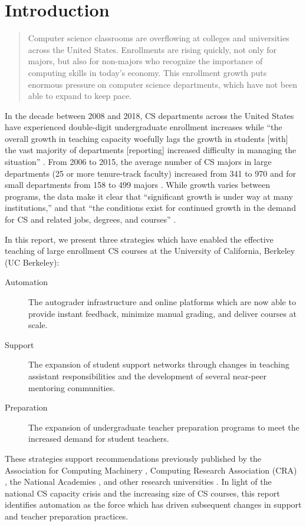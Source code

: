 \chapter{Introduction}
\label{chapter:introduction}

\begin{quote}
    Computer science classrooms are overflowing at colleges and universities across the United States. Enrollments are rising quickly, not only for majors, but also for non-majors who recognize the importance of computing skills in today's economy. This enrollment growth puts enormous pressure on computer science departments, which have not been able to expand to keep pace. \cite{Roberts:2018}
\end{quote}
In the decade between 2008 and 2018, CS departments across the United States have experienced double-digit undergraduate enrollment increases while ``the overall growth in teaching capacity woefully lags the growth in students [with] the vast majority of departments [reporting] increased difficulty in managing the situation'' \cite{TaulbeeSurvey2018}. From 2006 to 2015, the average number of CS majors in large departments (25 or more tenure-track faculty) increased from 341 to 970 and for small departments from 158 to 499 majors \cite{GenerationCS}. While growth varies between programs, the data make it clear that ``significant growth is under way at many institutions,'' and that ``the conditions exist for continued growth in the demand for CS and related jobs, degrees, and courses'' \cite{CSUndergraduateEnrollments}.

In this report, we present three strategies which have enabled the effective teaching of large enrollment CS courses at the University of California, Berkeley (UC Berkeley):
\begin{description}
    \item[Automation] The autograder infrastructure and online platforms which are now able to provide instant feedback, minimize manual grading, and deliver courses at scale.
    \item[Support] The expansion of student support networks through changes in teaching assistant responsibilities and the development of several near-peer mentoring communities.
    \item[Preparation] The expansion of undergraduate teacher preparation programs to meet the increased demand for student teachers.
\end{description}
These strategies support recommendations previously published by the Association for Computing Machinery \cite{RetentionCS}, Computing Research Association (CRA) \cite{GenerationCS}, the National Academies \cite{CSUndergraduateEnrollments}, and other research universities \cite{Maher:2015, Malan:2010, Porter:2013, Guo:2013, Hug:2015, Hug:2017, Reges:1988, Roberts:1995, Alvarado:2017, Minnes:2018, Kay:1998}. In light of the national CS capacity crisis and the increasing size of CS courses, this report identifies automation as the force which has driven subsequent changes in support and teacher preparation practices.

